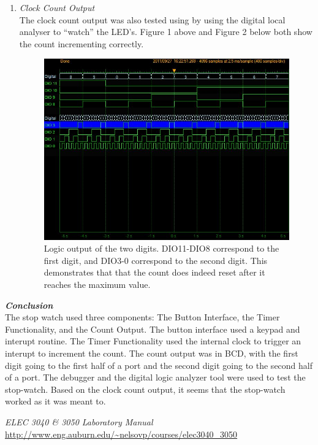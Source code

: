 \documentclass[10pt]{article}
\begin{document}
\begin{enumerate}
\newpage\item \emph{Clock Count Output}
\\The clock count output was also tested using by using the digital local
analyser to ``watch'' the LED's. Figure 1 above and Figure 2 below both show
the count incrementing correctly. 
\begin{figure}[h!]
\centering
\includegraphics[width=300pt,keepaspectratio]{Figure2}
\caption{\small{Logic output of the two digits. DIO11-DIO8 correspond to the 
first digit,
and DIO3-0 correspond to the second digit. This demonstrates that that the count
does indeed reset after it reaches the maximum value.  }}
\end{figure}
\end{enumerate}

\newpage\emph{\textbf{Conclusion}}
\\The stop watch used three components: The Button Interface, the Timer Functionality,
and the Count Output. The button interface used a keypad and interupt routine. The
Timer Functionality used the internal clock to trigger an interupt to increment
the count. The count output was in BCD, with the first digit going to the first half
of a port and the second digit going to the second half of a port. The 
debugger and the digital logic analyzer tool were used to test the stop-watch. Based
on the clock count output, it seems that the stop-watch worked as it was meant 
to. 

\begin{thebibliography}{9}
\emph{ELEC 3040 \& 3050 Laboratory Manual}\newline
\url{http://www.eng.auburn.edu/~nelsovp/courses/elec3040_3050}
\end{thebibliography}
\label{end}
\end{document}
